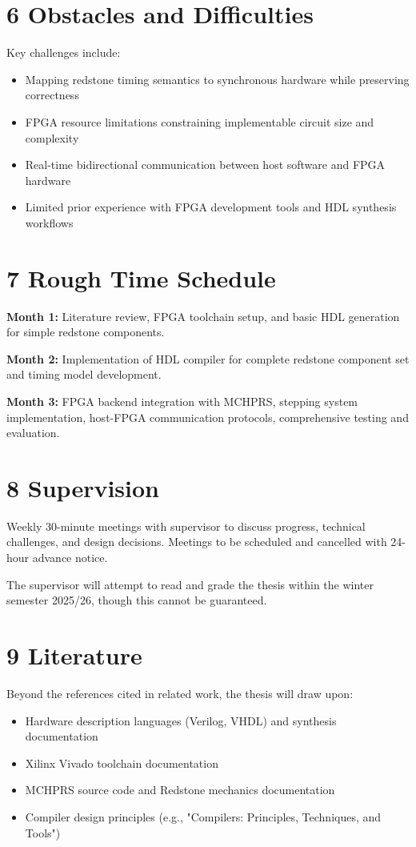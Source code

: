 \documentclass[a4paper,11pt]{article}
\begin{document}
\section*{6 Obstacles and Difficulties}

Key challenges include:
\begin{itemize}[parsep=0.5em]
    \item Mapping redstone timing semantics to synchronous hardware while preserving correctness
    \item FPGA resource limitations constraining implementable circuit size and complexity
    \item Real-time bidirectional communication between host software and FPGA hardware
    \item Limited prior experience with FPGA development tools and HDL synthesis workflows
\end{itemize}

\section*{7 Rough Time Schedule}

\textbf{Month 1:} Literature review, FPGA toolchain setup, and basic HDL generation for simple redstone components.

\textbf{Month 2:} Implementation of HDL compiler for complete redstone component set and timing model development.

\textbf{Month 3:} FPGA backend integration with MCHPRS, stepping system implementation, host-FPGA communication protocols, comprehensive testing and evaluation.

\section*{8 Supervision}

Weekly 30-minute meetings with supervisor to discuss progress, technical challenges, and design decisions.
Meetings to be scheduled and cancelled with 24-hour advance notice.

The supervisor will attempt to read and grade the thesis within the winter semester 2025/26, though this cannot be guaranteed.

\section*{9 Literature}

Beyond the references cited in related work, the thesis will draw upon:
\begin{itemize}[parsep=0.5em]
    \item Hardware description languages (Verilog, VHDL) and synthesis documentation
    \item Xilinx Vivado toolchain documentation
    \item MCHPRS source code and Redstone mechanics documentation
    \item Compiler design principles (e.g., "Compilers: Principles, Techniques, and Tools")
\end{itemize}

\printbibliography[title=References]
\end{document}
